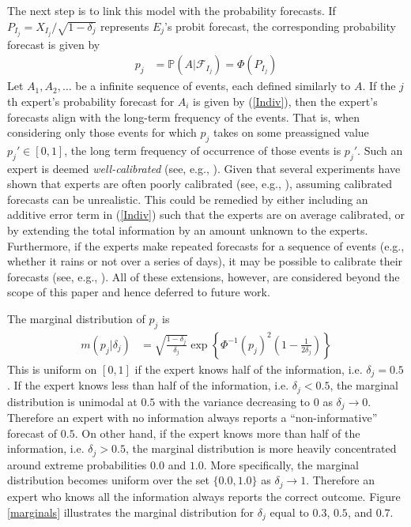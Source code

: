 \documentclass[11pt]{article}
\renewcommand{\P}{\mathbb{P}}
\theoremstyle{definition}
\theoremstyle{definition}
\begin{document}
The next step is to link this model with the probability forecasts. If  $P_{I_j} = X_{I_j}/\sqrt{1-\delta_j}$ represents $E_j$'s probit forecast, the corresponding probability forecast is given by
\begin{align}
p_j &= \P\left(A | \mathcal{F}_{I_j}\right) = \Phi\left( P_{I_j}\right) \label{Indiv}
\end{align}
Let $A_1, A_2, \dots$ be a infinite sequence of events, each defined similarly to $A$. If the $j$th expert's probability forecast for $A_i$ is given by (\ref{Indiv}), then the expert's forecasts align with the long-term frequency of the events. That is, when considering only those events for which $p_j$ takes on some preassigned value $p_j' \in [0, 1]$, the long term frequency of occurrence of those events is $p_j'$. Such an expert is deemed \textit{well-calibrated} (see, e.g., \citet{degroot1983comparison}). Given that several experiments have shown that experts are often poorly calibrated (see, e.g., \citet{cooke1991experts, shlyakhter1994quantifying}), assuming calibrated forecasts can be unrealistic. This could be remedied by  either including an additive error term in (\ref{Indiv}) such that the experts are on average calibrated, or by extending the total information by an amount unknown to the experts. Furthermore, if the experts make repeated forecasts for a sequence of events (e.g., whether it rains or not over a series of days), it may be possible to calibrate their forecasts (see, e.g., \citet{foster1998asymptotic, Brier}). All of these extensions, however, are considered beyond the scope of this paper and hence deferred to future work.

The marginal distribution of $p_j$ is
\begin{align*}
m(p_j | \delta_j) &= \sqrt{\frac{1-\delta_j}{\delta_j}} \exp \left\{ \Phi^{-1}(p_j)^2 \left(1-\frac{1}{2 \delta_j} \right) \right\} 
\end{align*}
This is uniform on $[0,1]$ if the expert knows half of the information, i.e. $\delta_j = 0.5$. If the expert knows less than half of the information, i.e. $\delta_j < 0.5$, the marginal distribution is unimodal at $0.5$ with the variance decreasing to 0 as $\delta_j \to 0$. Therefore an expert with no information always reports a ``non-informative'' forecast of $0.5$. On other hand, if the expert knows more than half of the information, i.e. $\delta_j > 0.5$, the marginal  distribution is more heavily concentrated around extreme probabilities $0.0$ and $1.0$. More specifically, the marginal distribution becomes uniform over the set $\{0.0,1.0\}$ as $\delta_j \to 1$. Therefore an expert who knows all the information always reports the correct outcome. Figure \ref{marginals} illustrates the marginal distribution for $\delta_j$ equal to $0.3$, $0.5$, and $0.7$. 
\end{document}
